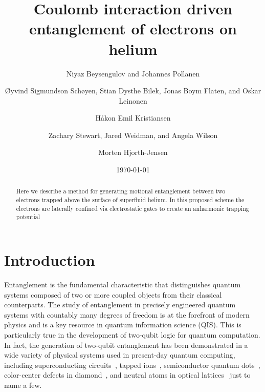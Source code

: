 \documentclass[twocolumn,superscriptaddress,unsortedaddress,
 amsmath,amssymb,
 aps,
]{revtex4-2}
\begin{document}

\title{Coulomb interaction driven entanglement of electrons on helium}

\author{Niyaz Beysengulov and Johannes Pollanen}
\author{Øyvind Sigmundson Schøyen, Stian Dysthe Bilek, Jonas Boym Flaten, and Oskar Leinonen}
\author{Håkon Emil Kristiansen}
\author{Zachary Stewart, Jared Weidman, and Angela Wilson}
\author{Morten Hjorth-Jensen}
\begin{abstract}
  Here we describe a method for generating motional entanglement between two electrons trapped above the surface of superfluid helium. In this proposed scheme the electrons are laterally confined via electrostatic gates to create an anharmonic trapping potential 
\end{abstract}



\date{\today}%


\maketitle

\section{Introduction} %
Entanglement is the fundamental characteristic that distinguishes
quantum systems composed of two or more coupled objects from their classical counterparts. The study of entanglement in precisely engineered quantum systems with countably many degrees of freedom is at the forefront of modern physics and is a key resource in quantum information science (QIS). This is particularly true in the development of two-qubit logic for quantum computation. In fact, the generation of two-qubit entanglement has been demonstrated in a wide variety of physical systems used in present-day quantum computing, including superconducting circuits~\cite{Steffen1423}, tapped ions~\cite{}, semiconductor quantum dots~\cite{Li809}, color-center defects in diamond~\cite{}, and neutral atoms in optical lattices~\cite{Saffman1010} just to name a few.
\end{document}
